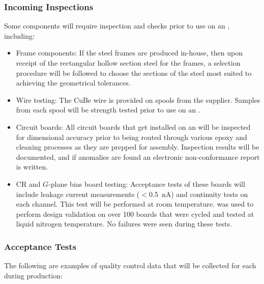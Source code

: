 \subsubsection{Incoming Inspections}

Some components will require inspection and  checks prior to use on an , including:

\begin{itemize}

\item Frame components: If the  steel frames are produced in-house, then upon receipt of the rectangular hollow section steel for the frames, a selection procedure will be followed to choose the sections of the steel most suited to achieving the geometrical tolerances. 

\item Wire testing: The CuBe wire is provided on spools from the supplier. Samples from each spool will be strength tested prior to use on an .

\item Circuit boards: All circuit boards that get installed on an  will be inspected for dimensional accuracy prior to being routed through various epoxy and cleaning processes as they are prepped for assembly. Inspection results will be documented, and if anomalies are found an electronic non-conformance report is written.  %

\item CR and $G$-plane bias board testing: Acceptance tests of these boards will include leakage current measurements ($<$\SI{0.5}{nA}) and continuity tests on each channel.  This test will be performed at room temperature.  was used to perform design validation on over 100 boards that were cycled and tested at liquid nitrogen temperature. No failures were seen during these tests. 

\end{itemize}

\subsubsection{ Acceptance Tests} 

The following are examples of quality control data that will be collected for each  during production:  

